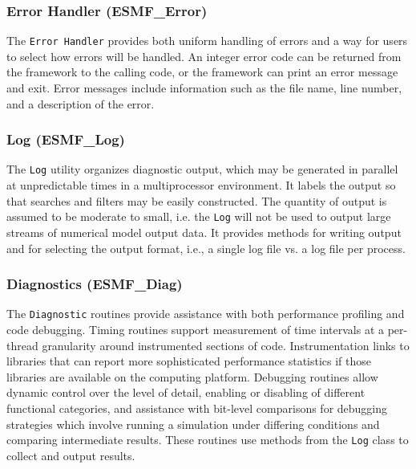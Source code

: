 \subsubsection{Error Handler (ESMF\_Error)}
\label{sec:error} 
The {\tt Error Handler} provides both uniform handling of errors and
a way for users to select how errors will be handled.
An integer error code can be returned from the framework to the
calling code, or the framework can print an error message and exit.
Error messages include information such as the file name, line number, 
and a description of the error.

\subsubsection{Log (ESMF\_Log)}
\label{sec:log} 
The {\tt Log} utility organizes diagnostic output, 
which may be generated in parallel at unpredictable times in
a multiprocessor environment.  It labels the output so that 
searches and filters may be easily constructed.  The quantity of
output is assumed to be moderate to small, i.e. the {\tt Log} 
will not be used to output large streams of numerical model output data.  
It provides methods for writing output and for selecting the
output format, i.e., a single log file vs. a log file per process.

\subsubsection{Diagnostics (ESMF\_Diag)}
\label{sec:diagnostics} 
The {\tt Diagnostic} routines provide assistance with both performance
profiling and code debugging.  Timing routines support measurement
of time intervals at a per-thread granularity around instrumented
sections of code.  Instrumentation links to libraries that can report 
more sophisticated performance statistics if those libraries are available 
on the computing platform.  Debugging routines allow dynamic control over the level
of detail, enabling or disabling of different functional categories,
and assistance with bit-level comparisons for debugging strategies which 
involve running a simulation under differing conditions and
comparing intermediate results.  These routines use methods from
the {\tt Log} class to collect and output results.








